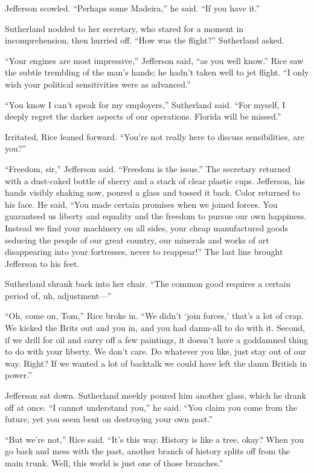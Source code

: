 Jefferson scowled. ``Perhaps some Madeira,'' he said. ``If you have it.''

Sutherland nodded to her secretary, who stared for a moment in incomprehension, then hurried off. ``How was the flight?'' Sutherland asked.

``Your engines are most impressive,'' Jefferson said, ``as you well know.'' Rice saw the subtle trembling of the man's hands; he hadn't taken well to jet flight. ``I only wish your political sensitivities were as advanced.''

``You know I can't speak for my employers,'' Sutherland said. ``For myself, I deeply regret the darker aspects of our operations. Florida will be missed.''

Irritated, Rice leaned forward. ``You're not really here to discuss sensibilities, are you?''

``Freedom, sir,'' Jefferson said. ``Freedom is the issue.'' The secretary returned with a dust-caked bottle of sherry and a stack of clear plastic cups. Jefferson, his hands visibly shaking now, poured a glass and tossed it back. Color returned to his face. He said, ``You made certain promises when we joined forces. You guaranteed us liberty and equality and the freedom to pursue our own happiness. Instead we find your machinery on all sides, your cheap manufactured goods seducing the people of our great country, our minerals and works of art disappearing into your fortresses, never to reappear!'' The last line brought Jefferson to his feet.

Sutherland shrank back into her chair. ``The common good requires a certain period of, uh, adjustment—''

``Oh, come on, Tom,'' Rice broke in. ``We didn't ‘join forces,' that's a lot of crap. We kicked the Brits out and you in, and you had damn-all to do with it. Second, if we drill for oil and carry off a few paintings, it doesn't have a goddamned thing to do with your liberty. We don't care. Do whatever you like, just stay out of our way. Right? If we wanted a lot of backtalk we could have left the damn British in power.''

Jefferson sat down. Sutherland meekly poured him another glass, which he drank off at once. ``I cannot understand you,'' he said. ``You claim you come from the future, yet you seem bent on destroying your own past.''

``But we're not,'' Rice said. ``It's this way. History is like a tree, okay? When you go back and mess with the past, another branch of history splits off from the main trunk. Well, this world is just one of those branches.''

